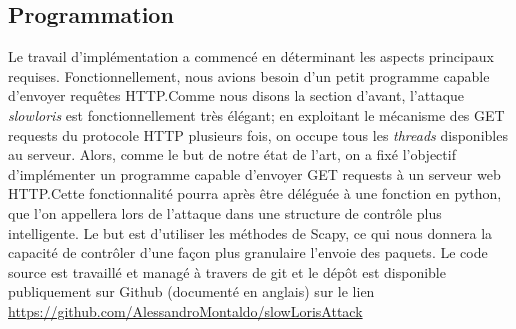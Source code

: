 \documentclass{article}
\begin{document}
\subsection{Programmation}
Le travail d'implémentation a commencé en déterminant les aspects principaux requises. Fonctionnellement, nous avions
besoin d'un petit programme capable d’envoyer requêtes HTTP.Comme nous disons la section d'avant,
l'attaque \textit{slowloris} est fonctionnellement très élégant; en exploitant le mécanisme des GET
requests du protocole HTTP plusieurs fois, on occupe tous les \textit{threads} disponibles au serveur.
Alors, comme le but de notre état de l'art, on a fixé l'objectif d’implémenter un programme capable d'envoyer
GET requests à un serveur web HTTP.Cette fonctionnalité pourra après être déléguée à une fonction en python,
que l'on appellera lors de l'attaque dans une structure de contrôle plus intelligente.
Le but est d'utiliser les méthodes de Scapy, ce qui nous donnera la capacité de contrôler d'une façon plus granulaire
l'envoie des paquets. Le code source est travaillé et managé à travers de
git et le dépôt est disponible publiquement sur Github (documenté en anglais) sur le lien \href{https://github.com/AlessandroMontaldo/slowLorisAttack}{https://github.com/AlessandroMontaldo/slowLorisAttack}
\end{document}
